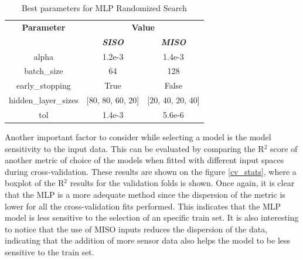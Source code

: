 \documentclass[conference]{IEEEtran}
\begin{document}
\begin{table}[htbp]
\caption{Best parameters for MLP Randomized Search}
\begin{center}
\begin{tabular}{|c|c|c|}
\hline
\textbf{Parameter}&\multicolumn{2}{|c|}{\textbf{Value}} \\
\cline{2-3} 
\textbf{} & \textbf{\textit{SISO}} & \textbf{\textit{MISO}} \\
\hline
alpha                &           1.2e-3 &           1.4e-3  \\
\hline
batch\_size          &               64 &              128  \\
\hline
early\_stopping      &             True &            False  \\
\hline
hidden\_layer\_sizes & [80, 80, 60, 20] & [20, 40, 20, 40]  \\
\hline
tol                  &           1.4e-3 &           5.6e-6  \\
\hline
\end{tabular}
\label{mlp_results}
\end{center}
\end{table}



Another important factor to consider while selecting a model is the model sensitivity to the input data. This can be evaluated by comparing the R$^2$ score of another metric of choice of the models when fitted with different input spaces during cross-validation. These results are shown on the figure \ref{cv_stats}, where a boxplot of the R$^2$ results for the validation folds is shown. Once again, it is clear that the MLP is a more adequate method since the dispersion of the metric is lower for all the cross-validation fits performed. This indicates that the MLP model is less sensitive to the selection of an specific train set. It is also interesting to notice that the use of MISO inputs reduces the dispersion of the data, indicating that the addition of more sensor data also helps the model to be less sensitive to the train set.
\end{document}
